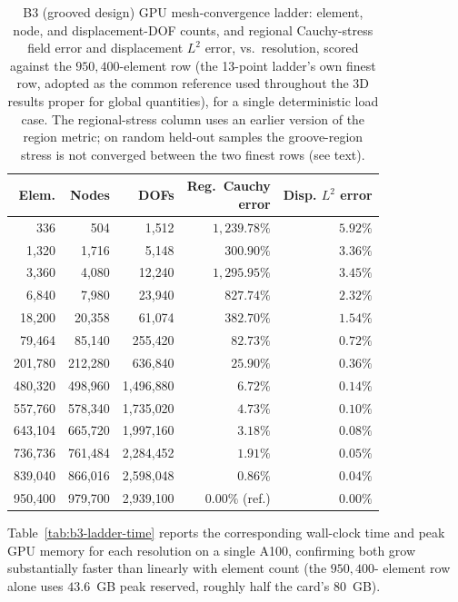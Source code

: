 \documentclass[final,5p,times]{elsarticle}
\begin{document}
\begin{table}[ht]
\centering
\caption{B3 (grooved design) GPU mesh-convergence ladder: element,
  node, and displacement-DOF counts, and regional Cauchy-stress field
  error and displacement $L^2$ error, vs.\ resolution, scored against
  the $950{,}400$-element row (the 13-point ladder's own finest row,
  adopted as the common reference used throughout the 3D results
  proper for global quantities), for a single deterministic load case.
  The regional-stress column uses an earlier version of the region
  metric; on random held-out samples the groove-region stress is not
  converged between the two finest rows (see text).}
\label{tab:b3-ladder}
\footnotesize
\setlength{\tabcolsep}{3pt}
\begin{tabular}{rrrrr}
\toprule
Elem. & Nodes & DOFs & \makecell{Reg.\ Cauchy\\error} & \makecell{Disp.\\$L^2$ error} \\
\midrule
336      & 504     & 1{,}512     & $1{,}239.78\%$ & $5.92\%$ \\
1{,}320    & 1{,}716   & 5{,}148     & $300.90\%$   & $3.36\%$ \\
3{,}360    & 4{,}080   & 12{,}240    & $1{,}295.95\%$ & $3.45\%$ \\
6{,}840    & 7{,}980   & 23{,}940    & $827.74\%$   & $2.32\%$ \\
18{,}200   & 20{,}358  & 61{,}074    & $382.70\%$   & $1.54\%$ \\
79{,}464   & 85{,}140  & 255{,}420   & $82.73\%$    & $0.72\%$ \\
201{,}780  & 212{,}280 & 636{,}840   & $25.90\%$    & $0.36\%$ \\
480{,}320  & 498{,}960 & 1{,}496{,}880 & $6.72\%$     & $0.14\%$ \\
557{,}760  & 578{,}340 & 1{,}735{,}020 & $4.73\%$     & $0.10\%$ \\
643{,}104  & 665{,}720 & 1{,}997{,}160 & $3.18\%$     & $0.08\%$ \\
736{,}736  & 761{,}484 & 2{,}284{,}452 & $1.91\%$     & $0.05\%$ \\
839{,}040  & 866{,}016 & 2{,}598{,}048 & $0.86\%$     & $0.04\%$ \\
950{,}400  & 979{,}700 & 2{,}939{,}100 & $0.00\%$ (ref.) & $0.00\%$ \\
\bottomrule
\end{tabular}
\end{table}

Table~\ref{tab:b3-ladder-time} reports the corresponding wall-clock time
and peak GPU memory for each resolution on a single A100, confirming both
grow substantially faster than linearly with element count (the $950{,}400$-
element row alone uses $43.6$~GB peak reserved, roughly half the card's
$80$~GB).
\end{document}

